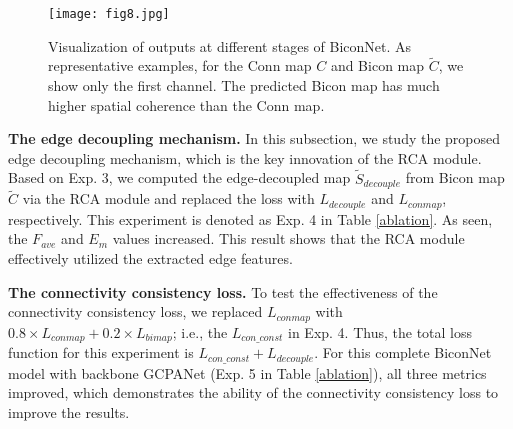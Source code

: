 \documentclass[review]{cvpr}
\begin{document}
\begin{table}[h]
\renewcommand\arraystretch{1.2}
\centering
{}

\end{table}

\begin{figure}[h]
\begin{center}
   \texttt{[image: fig8.jpg]}
\end{center}
\vspace{-8pt}
\caption{Visualization of outputs at different stages of BiconNet. As representative examples, for the Conn map $C$ and Bicon map $\widetilde{C}$, we show only the first channel. The predicted Bicon map has much higher spatial coherence than the Conn map.}
\label{BV_visualization}
\vspace{-10pt}
\end{figure}

\textbf{The edge decoupling mechanism.} In this subsection, we study the proposed edge decoupling mechanism, which is the key innovation of the RCA module. Based on Exp. 3, we computed the edge-decoupled map $\widetilde{S}_{decouple}$ from Bicon map $\widetilde{C}$ via the RCA module and replaced the loss with $L_{decouple}$ and $L_{conmap}$, respectively. This experiment is denoted as Exp. 4 in Table \ref{ablation}. As seen, the $F_{ave}$ and $E_m$ values increased. This result shows that the RCA module effectively utilized the extracted edge features.



\textbf{The connectivity consistency loss.} To test the effectiveness of the connectivity consistency loss, we replaced $L_{conmap}$ with $0.8 \times L_{conmap}+0.2 \times L_{bimap}$; i.e., the $L_{con\_const}$ in Exp. 4. Thus, the total loss function for this experiment is $L_{con\_const}+L_{decouple}$. For this complete BiconNet model with backbone GCPANet (Exp. 5 in Table \ref{ablation}), all three metrics improved, which demonstrates the ability of the connectivity consistency loss to improve the results.
\end{document}
